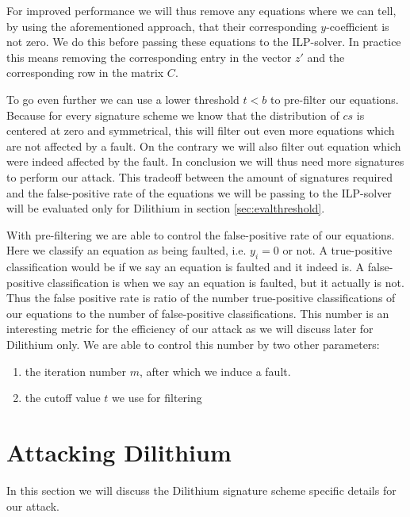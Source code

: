 \documentclass[a4paper,titlepage]{article}
\begin{document}
For improved performance we will thus remove any equations where we can tell, by using the aforementioned approach, that their corresponding $y$-coefficient is not zero. We do this before passing these equations to the ILP-solver. In practice this means removing the corresponding entry in the vector $z'$ and the corresponding row in the matrix $C$.

To go even further we can use a lower threshold $t < b$ to pre-filter our equations. Because for every signature scheme we know that the distribution of $cs$ is centered at zero and symmetrical, this will filter out even more equations which are not affected by a fault. On the contrary we will also filter out equation which were indeed affected by the fault. In conclusion we will thus need more signatures to perform our attack. This tradeoff between the amount of signatures required and the false-positive rate of the equations we will be passing to the ILP-solver will be evaluated only for Dilithium in section \ref{sec:evalthreshold}.


With pre-filtering we are able to control the false-positive rate of our equations. Here we classify an equation as being faulted, i.e. $y_{i} = 0$ or not. A true-positive classification would be if we say an equation is faulted and it indeed is. A false-positive classification is when we say an equation is faulted, but it actually is not. Thus the false positive rate is ratio of the number true-positive classifications of our equations to the number of false-positive classifications. This number is an interesting metric for the efficiency of our attack as we will discuss later for Dilithium only.
We are able to control this number by two other parameters:
\begin{enumerate}
	\item the iteration number $m$, after which we induce a fault.
	\item the cutoff value $t$ we use for filtering
\end{enumerate}







\section{Attacking Dilithium}
\label{sec:attackdilithium}

In this section we will discuss the Dilithium signature scheme specific details for our attack.
\end{document}
